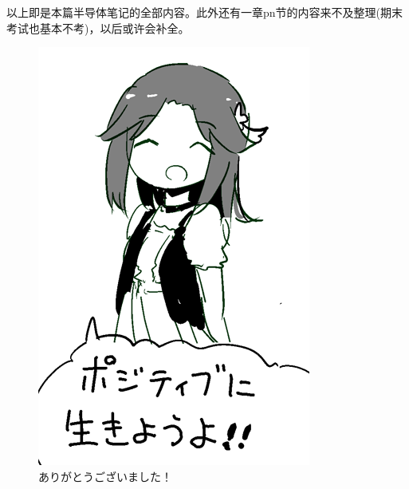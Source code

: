 \chapter*{ }

以上即是本篇半导体笔记的全部内容。此外还有一章pn节的内容来不及整理(期末考试也基本不考)，以后或许会补全。

\begin{figure}[ht]
    \centering
    \includegraphics[width=0.7\linewidth]{teru2.png}
    \caption*{\mincho ありがとうございました！}
    \label{fig:teru2}
\end{figure}



